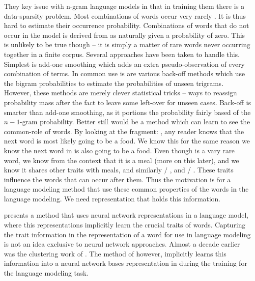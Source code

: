 \documentclass[parskip]{komatufte}
\begin{document}
They key issue with n-gram language models in that in training them there is a data-sparsity problem.
Most combinations of words occur very rarely .
It is thus hard to estimate their occurrence probability.
Combinations of words that do not occur in the model is derived from as naturally given a probability of zero.
This is unlikely to be true though -- it is simply a matter of rare words never occurring together in a finite corpus.
Several approaches have been taken to handle this.
Simplest is add-one smoothing which adds an extra pseudo-observation of every combination of terms.
In common use is are various back-off methods  which use the bigram probabilities to estimate the probabilities of unseen trigrams.
%
%
However, these methods are merely clever statistical tricks -- ways to reassign probability mass after the fact to leave some left-over for unseen cases.
Back-off is smarter than add-one smoothing, as it portions the probability fairly based of the $n{-}1$-gram probability.
Better still would be a method which can learn to see the common-role of words.
By looking at the fragment: , any reader knows that the next word is most likely going to be a food.
We know this for the same reason we know the next word in  is also going to be a food.
Even though  is a vary rare word, we know from the context that it is a meal (more on this later), and we know it shares other traits with meals, and similarly  / , and  / .
These traits influence the words that can occur after them.
Thus the motivation is for a language modeling method that use these common properties of the words in the language modeling.
We need representation that holds this information.


 presents a method that uses neural network representations in a language model, where this representations implicitly learn the crucial traits of words.
Capturing the trait information in the representation of a word for use in language modeling is not an idea exclusive to neural network approaches.
Almost a decade earlier was the clustering work of  .
The method of  however, implicitly learns this information into a neural network bases representation in during the training for the language modeling task.
\end{document}
